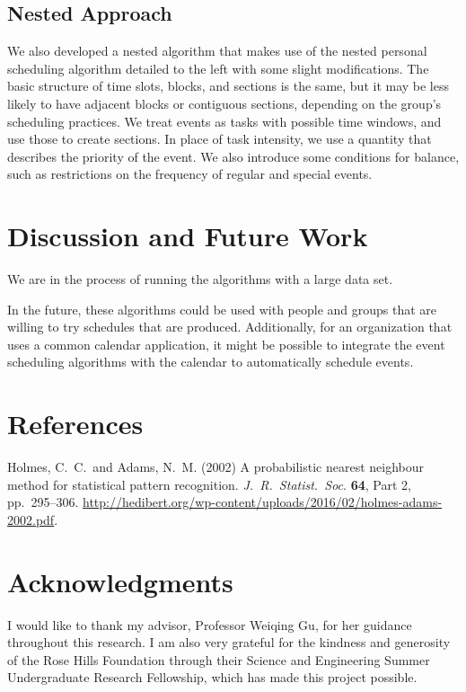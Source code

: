 \documentclass[thesis]{hmcposter}
\begin{document}
\begin{poster}
\subsection{Nested Approach}
We also developed a nested algorithm that makes use of the nested personal scheduling algorithm detailed to the left with some slight modifications.
The basic structure of time slots, blocks, and sections is the same, but it may be less likely to have adjacent blocks or contiguous sections, depending on the group's scheduling practices.
We treat events as tasks with possible time windows, and use those to create sections.
In place of task intensity, we use a quantity that describes the priority of the event.
We also introduce some conditions for balance, such as restrictions on the frequency of regular and special events.


\section{Discussion and Future Work}
We are in the process of running the algorithms with a large data set.

In the future, these algorithms could be used with people and groups that are willing to try schedules that are produced.
Additionally, for an organization that uses a common calendar application, it might be possible to integrate the event scheduling algorithms with the calendar to automatically schedule events.


\section{References}

%
Holmes, C.~C.~and Adams, N.~M. (2002) A probabilistic nearest neighbour method for statistical pattern recognition. \emph{J.~R.~Statist.~Soc}. \textbf{64}, Part 2, pp.~295--306.
 \url{http://hedibert.org/wp-content/uploads/2016/02/holmes-adams-2002.pdf}.


\section{Acknowledgments}
I would like to thank my advisor, Professor Weiqing Gu, for her guidance throughout this research.
I am also very grateful for the kindness and generosity of the Rose Hills Foundation through their Science and Engineering Summer Undergraduate Research Fellowship, which has made this project possible.


\end{poster}
\end{document}
